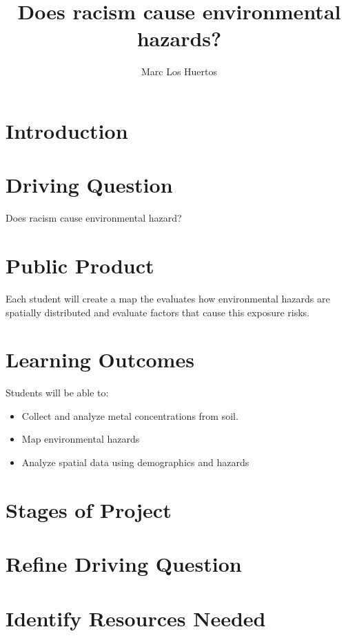 \documentclass{article}
\author{Marc Los Huertos}
\title{Does racism cause environmental hazards?}
\begin{document}

\maketitle

\section{Introduction}

\section{Driving Question}

Does racism cause environmental hazard?

\section{Public Product}

Each student will create a map the evaluates how environmental hazards are spatially distributed and evaluate factors that cause this exposure risks.


\section{Learning Outcomes}

Students will be able to: 

\begin{itemize}
  \item Collect and analyze metal concentrations from soil.
  \item Map environmental hazards
  \item Analyze spatial data using demographics and hazards

\end{itemize}

\section{Stages of Project}

\section{Refine Driving Question}

\section{Identify Resources Needed}
\end{document}
